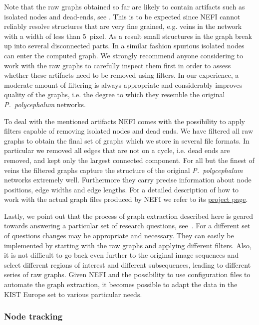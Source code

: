 	      Note that the raw graphs obtained so far are likely to contain artifacts such as isolated nodes and dead-ends, see . This is to be expected since NEFI cannot reliably resolve structures that are very fine grained, e.g. veins in the network with a width of less than $5$~pixel. As a result small structures in the graph break up into several disconnected parts. In a similar fashion spurious isolated nodes can enter the computed graph. We strongly recommend anyone considering to work with the raw graphs to carefully inspect them first in order to assess whether these artifacts need to be removed using filters. In our experience, a moderate amount of filtering is always appropriate and considerably improves quality of the graphs, i.e. the degree to which they resemble the original \emph{P.~polycephalum} networks.

	      To deal with the mentioned artifacts NEFI comes with the possibility to apply filters capable of removing isolated nodes and dead ends. We have filtered all raw graphs to obtain the final set of graphs which we store in several file formats. In particular we removed all edges that are not on a cycle, i.e. dead ends are removed, and kept only the largest connected component. For all but the finest of veins the filtered graphs capture the structure of the original \emph{P.~polycephalum} networks extremely well. Furthermore they carry precise information about node positions, edge widths and edge lengths. For a detailed description of how to work with the actual graph files produced by NEFI we refer to its \href{http://nefi.mpi-inf.mpg.de}{project page}.

	      Lastly, we point out that the process of graph extraction described here is geared towards answering a particular set of research questions, see~\cite{dirnberger2016}. For a different set of questions changes may be appropriate and necessary. They can easily be implemented by starting with the raw graphs and applying different filters. Also, it is not difficult to go back even further to the original image sequences and select different regions of interest and different subsequences, leading to different series of raw graphs. Given NEFI and the possibility to use configuration files to automate the graph extraction, it becomes possible to adapt the data in the KIST Europe set to various particular needs.

	    \subsubsection{Node tracking}

